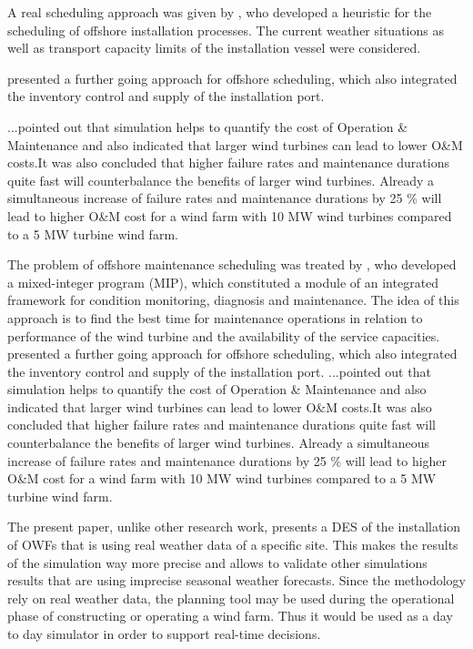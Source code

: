 A real scheduling approach was given by \cite{Scholz2010}, who developed a heuristic for the scheduling of offshore installation processes. The current weather situations as well as transport capacity limits of the installation vessel were considered.



\cite{ISOPE2012} presented a further going approach for offshore scheduling, which also integrated the inventory control and supply of the installation port.




\cite{Hofmann2014} ...pointed out that simulation helps to quantify the cost of Operation \& Maintenance  and also indicated that larger wind turbines can lead to lower O\&M costs.It was also concluded that higher failure rates and maintenance durations quite fast will counterbalance the benefits of larger wind turbines. Already a simultaneous increase of failure rates and maintenance durations by 25 \% will lead to higher O\&M cost for a wind farm with 10 MW wind turbines compared to a 5 MW turbine wind farm. 



The problem of offshore maintenance scheduling was treated by \cite{Kovacs2011497}, who developed a mixed-integer program (MIP), which constituted a module of an integrated framework for condition monitoring, diagnosis and maintenance. The idea of this approach is to find the best time for maintenance operations in relation to performance of the wind turbine and the availability of
the service capacities.
\cite{ISOPE2012} presented a further going approach for offshore scheduling, which also integrated the inventory control and supply 
of the installation port.
\cite{Hofmann2014} ...pointed out that simulation helps to quantify the cost of Operation \& Maintenance  and also indicated that 
larger wind turbines can lead to lower O\&M costs.It was also concluded that higher failure rates and maintenance durations quite 
fast will counterbalance the benefits of larger wind turbines. Already a simultaneous increase of failure rates and maintenance 
durations by 25 \% will lead to higher O\&M cost for a wind farm with 10 MW wind turbines compared to a 5 MW turbine wind farm. 


The present paper, unlike other research work, presents a DES of the installation of OWFs that is using real weather data of a specific site. This makes the results of the simulation way more precise and allows to validate other simulations results that are using imprecise seasonal weather forecasts. Since the methodology rely on real weather data, the planning tool may be used during the operational phase of constructing or operating a wind farm. Thus it would be used as a day to day simulator in order to support real-time decisions.
